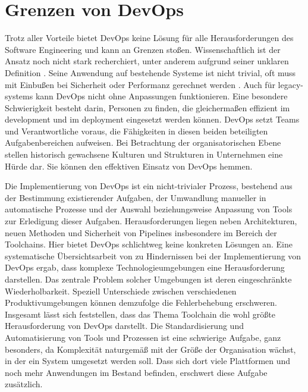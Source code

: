 \section{Grenzen von DevOps}
\label{sec:03-02_limitations-of-devops}

Trotz aller Vorteile bietet DevOps keine Lösung für alle Herausforderungen des Software Engineering und kann an Grenzen stoßen. Wissenschaftlich ist der Ansatz noch nicht stark recherchiert, unter anderem aufgrund seiner unklaren Definition \cite{009:GitOps-Evolution-of-DevOps}. Seine Anwendung auf bestehende Systeme ist nicht trivial, oft muss mit Einbußen bei Sicherheit oder Performanz gerechnet werden \cite{000:CI-CD-Deployment-in-DevOps-reduce-Gap-Developer-Operation}. Auch für \Glspl{legacy-system} kann DevOps nicht ohne Anpassungen funktionieren. Eine besondere Schwierigkeit besteht darin, Personen zu finden, die gleichermaßen effizient im \Gls{development} und im \Gls{deployment} eingesetzt werden können. DevOps setzt Teams und Verantwortliche voraus, die Fähigkeiten in diesen beiden beteiligten Aufgabenbereichen aufweisen. \cite{001:DevOps-Adoption-in-Software-Development} Bei Betrachtung der organisatorischen Ebene stellen historisch gewachsene Kulturen und Strukturen in Unternehmen eine Hürde dar. Sie können den effektiven Einsatz von DevOps hemmen. \cite{000:CI-CD-Deployment-in-DevOps-reduce-Gap-Developer-Operation}

Die Implementierung von DevOps ist ein nicht-trivialer Prozess, bestehend aus der Bestimmung existierender Aufgaben, der Umwandlung manueller in automatische Prozesse und der Auswahl beziehungsweise Anpassung von Tools zur Erledigung dieser Aufgaben. Herausforderungen liegen neben Architekturen, neuen Methoden und Sicherheit von Pipelines insbesondere im Bereich der Toolchains. \cite{007:Analysis-of-Declarative-and-Pull-based-Deployment-Models-on-GitOps} Hier bietet DevOps schlichtweg keine konkreten Lösungen an. Eine systematische Übersichtsarbeit von \citeauthor{001:DevOps-Adoption-in-Software-Development} zu Hindernissen bei der Implementierung von DevOps ergab, dass komplexe Technologieumgebungen eine Herausforderung darstellen. Das zentrale Problem solcher Umgebungen ist deren eingeschränkte Wiederholbarkeit. Speziell Unterschiede zwischen verschiedenen Produktivumgebungen können demzufolge die Fehlerbehebung erschweren. \cite{001:DevOps-Adoption-in-Software-Development} Insgesamt lässt sich feststellen, dass das Thema Toolchain die wohl größte Herausforderung von DevOps darstellt. Die Standardisierung und Automatisierung von Tools und Prozessen ist eine schwierige Aufgabe, ganz besonders, da Komplexität naturgemäß mit der Größe der Organisation wächst, in der ein System umgesetzt werden soll. Dass sich dort viele Plattformen und noch mehr Anwendungen im Bestand befinden, erschwert diese Aufgabe zusätzlich. \cite{000:CI-CD-Deployment-in-DevOps-reduce-Gap-Developer-Operation}

